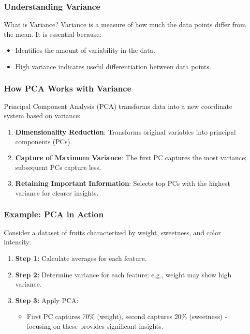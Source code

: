 \documentclass[aspectratio=169]{beamer}
\begin{document}
\begin{frame}[fragile]
    \frametitle{Understanding Variance}
    \begin{block}{What is Variance?}
        Variance is a measure of how much the data points differ from the mean. It is essential because:
        \begin{itemize}
            \item Identifies the amount of variability in the data.
            \item High variance indicates useful differentiation between data points.
        \end{itemize}
    \end{block}
\end{frame}

\begin{frame}[fragile]
    \frametitle{How PCA Works with Variance}
    Principal Component Analysis (PCA) transforms data into a new coordinate system based on variance:
    \begin{enumerate}
        \item \textbf{Dimensionality Reduction}: Transforms original variables into principal components (PCs).
        \item \textbf{Capture of Maximum Variance}: The first PC captures the most variance; subsequent PCs capture less.
        \item \textbf{Retaining Important Information}: Selects top PCs with the highest variance for clearer insights.
    \end{enumerate}
\end{frame}

\begin{frame}[fragile]
    \frametitle{Example: PCA in Action}
    Consider a dataset of fruits characterized by weight, sweetness, and color intensity:
    \begin{enumerate}
        \item \textbf{Step 1:} Calculate averages for each feature.
        \item \textbf{Step 2:} Determine variance for each feature; e.g., weight may show high variance.
        \item \textbf{Step 3:} Apply PCA:
            \begin{itemize}
                \item First PC captures 70\% (weight), second captures 20\% (sweetness) - focusing on these provides significant insights.
            \end{itemize}
    \end{enumerate}
\end{frame}
\end{document}
